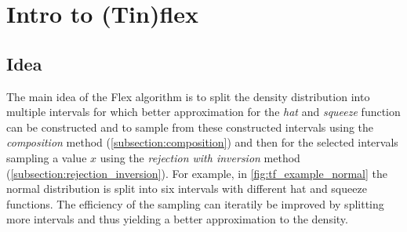 \section{Intro to (Tin)flex}

\subsection{Idea}

The main idea of the Flex algorithm is to split the density distribution into multiple intervals for which better approximation for the
\textit{hat} and \textit{squeeze} function can be constructed and to sample from these constructed intervals using the \textit{composition} method (\autoref{subsection:composition})
and then for the selected intervals sampling a value $x$ using the \textit{rejection with inversion} method (\autoref{subsection:rejection_inversion}).
For example, in \autoref{fig:tf_example_normal} the normal distribution is split into six intervals with different hat and squeeze functions.
The efficiency of the sampling can iteratily be improved by splitting more intervals and thus yielding a better approximation to the density.

